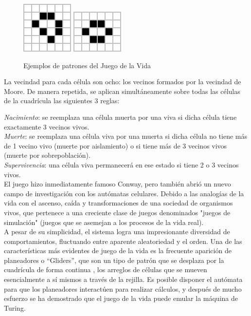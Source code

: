 \begin{figure}[H]
\centering
\includegraphics[scale=0.6]{imagenes/life_1.png}
\hspace{2cm}
\includegraphics[scale=0.6]{imagenes/life_2.png}
\caption{Ejemplos de patrones del Juego de la Vida}
\label{fig:patrones}
\end{figure}


La vecindad para cada célula son ocho: los vecinos formados por la vecindad de  Moore. De manera repetida, se aplican simultáneamente sobre todas las células de la cuadrícula las siguientes 3 reglas:

\textit{Nacimiento}: se reemplaza una célula muerta por una viva si dicha célula tiene exactamente 3 vecinos vivos.\\
\textit{Muerte}: se reemplaza una célula viva por una muerta si dicha célula no tiene más de 1 vecino vivo (muerte por aislamiento) o si tiene más de 3 vecinos vivos (muerte por sobrepoblación).\\
\textit{Supervivencia}: una célula viva permanecerá en ese estado si tiene 2 o 3 vecinos vivos.\\

El juego hizo inmediatamente famoso Conway, pero también abrió un nuevo campo de investigación con los autómatas celulares. Debido a las analogías de la vida con el ascenso, caída y transformaciones de una sociedad de organismos vivos, que pertenece a una creciente clase de juegos denominados "juegos de simulación" (juegos que se asemejan a los procesos de la vida real).\\

A pesar de su simplicidad, el sistema logra una impresionante diversidad de comportamientos, fluctuando entre aparente aleatoriedad y el orden. Una de las características más evidentes de juego de la vida es la frecuente aparición de planeadores o ``Gliders'', que son un tipo de patrón que se desplaza por la cuadrícula de forma continua , los arreglos de células que se mueven esencialmente a sí mismos a través de la rejilla. Es posible disponer el autómata para que los planeadores interactúen para realizar cálculos, y después de mucho esfuerzo se ha demostrado que el juego de la vida puede emular  la máquina de Turing.

